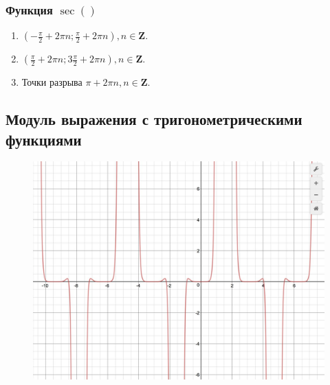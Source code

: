 \documentclass[a4paper,10pt]{article}
\begin{document}
		\subsubsection*{Функция $\sec()$}
		\begin{enumerate}
            \item $(-\frac {\pi} {2}+2\pi n; \frac {\pi} {2}+2\pi n), n \in \mathbf Z.$ 
            \item $(\frac {\pi} {2}+2\pi n;3\frac {\pi} {2}+2\pi n), n \in \mathbf Z.$ 
            \item Точки разрыва $\pi +2\pi n, n \in \mathbf Z$.
		\end{enumerate}

    \subsection*{Модуль выражения с тригонометрическими функциями}
		\begin{figure}[h!]
			\includegraphics[scale=0.2]{./images/trigonometric_graphic.png}
		\end{figure}
\end{document}

